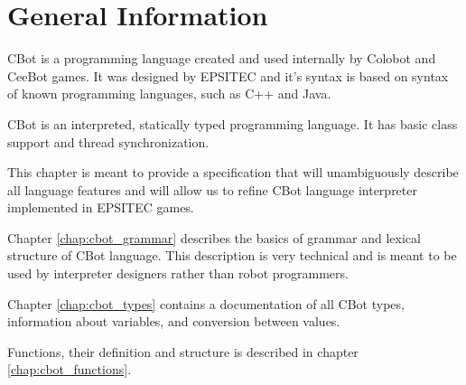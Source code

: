 
\chapter{General Information}

CBot is a programming language created and used internally by Colobot and CeeBot games. It was designed by EPSITEC and it's syntax is based on syntax of known programming languages, such as C++ and Java.

CBot is an interpreted, statically typed programming language. It has basic class support and thread synchronization.

This chapter is meant to provide a specification that will unambiguously describe all language features and will allow us to refine CBot language interpreter implemented in EPSITEC games.

Chapter \ref{chap:cbot_grammar} describes the basics of grammar and lexical structure of CBot language. This description is very technical and is meant to be used by interpreter designers rather than robot programmers.

Chapter \ref{chap:cbot_types} contains a documentation of all CBot types, information about variables, and conversion between values.

Functions, their definition and structure is described in chapter \ref{chap:cbot_functions}.

